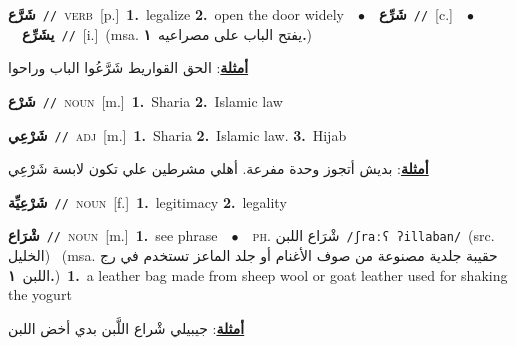 \documentclass[10pt,a4paper,twoside]{article} %
\begin{document}
\begin{multicols}{2}
{\setlength\topsep{0pt}\textbf{\foreignlanguage{arabic}{شَرَّع}}\ {\color{gray}\texttt{//}\color{black}}\ \textsc{verb}\ [p.]\ \textbf{1.}~legalize  \textbf{2.}~open the door widely\ \ $\bullet$\ \ \setlength\topsep{0pt}\textbf{\foreignlanguage{arabic}{شَرِّع}}\ {\color{gray}\texttt{//}\color{black}}\ [c.]\ \ $\bullet$\ \ \setlength\topsep{0pt}\textbf{\foreignlanguage{arabic}{يشَرِّع}}\ {\color{gray}\texttt{//}\color{black}}\ [i.]\ \color{gray}(msa. \foreignlanguage{arabic}{يفتح الباب على مصراعيه}~\foreignlanguage{arabic}{\textbf{١.}})\color{black}\  \begin{flushright}\color{gray}\foreignlanguage{arabic}{\textbf{\underline{\foreignlanguage{arabic}{أمثلة}}}: الحق القواريط شَرَّعُوا الباب وراحوا}\end{flushright}\color{black}} \vspace{2mm}

{\setlength\topsep{0pt}\textbf{\foreignlanguage{arabic}{شَرْع}}\ {\color{gray}\texttt{//}\color{black}}\ \textsc{noun}\ [m.]\ \textbf{1.}~Sharia  \textbf{2.}~Islamic law\ } \vspace{2mm}

{\setlength\topsep{0pt}\textbf{\foreignlanguage{arabic}{شَرْعِي}}\ {\color{gray}\texttt{//}\color{black}}\ \textsc{adj}\ [m.]\ \textbf{1.}~Sharia  \textbf{2.}~Islamic law.  \textbf{3.}~Hijab\  \begin{flushright}\color{gray}\foreignlanguage{arabic}{\textbf{\underline{\foreignlanguage{arabic}{أمثلة}}}: بديش  أتجوز وحدة مفرعة. أهلي مشرطين علي تكون لابسة شَرْعِي}\end{flushright}\color{black}} \vspace{2mm}

{\setlength\topsep{0pt}\textbf{\foreignlanguage{arabic}{شَرْعِيِّة}}\ {\color{gray}\texttt{//}\color{black}}\ \textsc{noun}\ [f.]\ \textbf{1.}~legitimacy  \textbf{2.}~legality\ } \vspace{2mm}

{\setlength\topsep{0pt}\textbf{\foreignlanguage{arabic}{شْرَاع}}\ {\color{gray}\texttt{//}\color{black}}\ \textsc{noun}\ [m.]\ \textbf{1.}~see phrase\ \ $\bullet$\ \ \textsc{ph.} \color{gray} \foreignlanguage{arabic}{شْرَاع اللبن}\color{black}\ {\color{gray}\texttt{/{\sffamily ʃraːʕ ʔillaban}/}\color{black}}\ \color{gray}(src. \foreignlanguage{arabic}{الخليل})\color{black}\ \color{gray} (msa. \foreignlanguage{arabic}{حقيبة جلدية مصنوعة من صوف الأغنام أو جلد الماعز تستخدم في رج اللبن}~\foreignlanguage{arabic}{\textbf{١.}})\color{black}\ \textbf{1.}~a leather bag made from sheep wool or goat leather used for shaking the yogurt\  \begin{flushright}\color{gray}\foreignlanguage{arabic}{\textbf{\underline{\foreignlanguage{arabic}{أمثلة}}}: جيبيلي شْراع اللَّبن بدي أخض اللبن}\end{flushright}\color{black}} \vspace{2mm}


\end{multicols}
\end{document}
